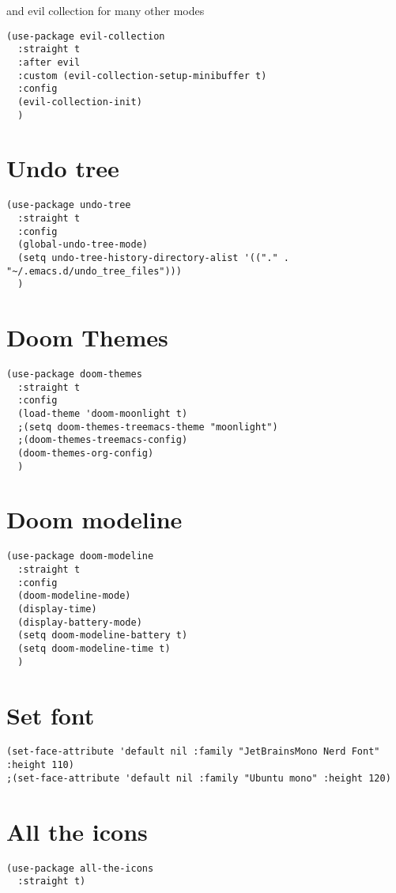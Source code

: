 \documentclass[11pt]{article}
\begin{document}
and evil collection for many other modes

\begin{verbatim}
(use-package evil-collection
  :straight t
  :after evil
  :custom (evil-collection-setup-minibuffer t)
  :config
  (evil-collection-init)
  )
\end{verbatim}
\section{Undo tree}
\label{sec:orgd64586c}
\begin{verbatim}
(use-package undo-tree
  :straight t
  :config
  (global-undo-tree-mode)
  (setq undo-tree-history-directory-alist '(("." . "~/.emacs.d/undo_tree_files")))
  )
\end{verbatim}
\section{Doom Themes}
\label{sec:org87ba403}
\begin{verbatim}
(use-package doom-themes
  :straight t
  :config
  (load-theme 'doom-moonlight t)
  ;(setq doom-themes-treemacs-theme "moonlight")
  ;(doom-themes-treemacs-config)
  (doom-themes-org-config)
  )
\end{verbatim}
\section{Doom modeline}
\label{sec:orgf5aa5ca}
\begin{verbatim}
(use-package doom-modeline
  :straight t
  :config
  (doom-modeline-mode)
  (display-time)
  (display-battery-mode)
  (setq doom-modeline-battery t)
  (setq doom-modeline-time t)
  )
\end{verbatim}
\section{Set font}
\label{sec:orgbf23429}
\begin{verbatim}
(set-face-attribute 'default nil :family "JetBrainsMono Nerd Font" :height 110)
;(set-face-attribute 'default nil :family "Ubuntu mono" :height 120)
\end{verbatim}
\section{All the icons}
\label{sec:orgba0e0b5}
\begin{verbatim}
(use-package all-the-icons
  :straight t)
\end{verbatim}
\end{document}
